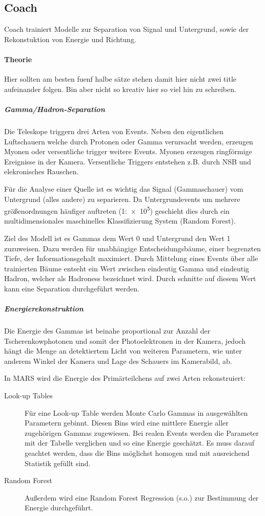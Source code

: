 \subsection{Coach}%
\label{sub:coach}
Coach trainiert Modelle zur Separation von Signal und Untergrund, 
sowie der Rekonstuktion von Energie und Richtung.
\paragraph{Theorie}%
\label{par:theorie}
{\color{red}Hier sollten am besten fuenf halbe sätze stehen damit hier nicht zwei title aufeinander
folgen. Bin aber nicht so kreativ hier so viel hin zu schreiben.}

\subparagraph{Gamma/Hadron-Separation}
Die Teleskope triggern drei Arten von Events. 
Neben den eigentlichen Luftschauern welche durch Protonen 
oder Gamma verursacht werden,
erzeugen Myonen oder versentliche trigger weitere Events.
Myonen erzeugen ringförmige Ereignisse in der Kamera.
Versentliche Triggers entstehen z.B. durch NSB und elekronisches Rauschen.

Für die Analyse einer Quelle ist es wichtig das Signal (Gammaschauer) vom 
Untergrund (alles andere) zu separieren.
Da Untergrundevents um mehrere größenordnungen häufiger auftreten (1:\num{e5})
geschieht dies durch ein multidimensionales maschinelles Klassifizierung 
System (Random Forest).

Ziel des Modell ist es Gammas dem Wert 0 und Untergrund den Wert 1 zuzuweisen.
Dazu werden für unabhängige Entscheidungsbäume, 
einer begrenzten Tiefe, 
der Informationsgehalt maximiert.
Durch Mittelung eines Events über alle trainierten Bäume entseht ein Wert
zwischen eindeutig Gamma und eindeutig Hadron, welcher als Hadroness bezeichnet
wird.
Durch schnitte auf diesem Wert kann eine Separation durchgeführt werden.

\subparagraph{Energierekonstruktion}%
\label{par:energie}

Die Energie des Gammas ist beinahe proportional
zur Anzahl der Tscherenkowphotonen
und somit der Photoelektronen in der Kamera,
jedoch hängt die Menge an detektiertem Licht von weiteren Parametern,
wie unter anderem Winkel der Kamera und Lage des Schauers im Kamerabild, ab.

In MARS wird die Energie des Primärteilchens auf zwei Arten rekonstruiert:
\begin{description}
	\item[\quad Look-up Tables] Für eine Look-up Table werden Monte Carlo 
		Gammas in ausgewählten Parametern gebinnt.
		Diesen Bins wird eine mittlere Energie aller
		zugehörigen Gammas zugewiesen.
		Bei realen Events werden die Parameter mit der Tabelle verglichen
		und so eine Energie geschätzt.
		Es muss darauf geachtet werden,
		dass die Bins möglichst homogen und mit ausreichend Statistik gefüllt sind.
	\item[\quad Random Forest] Außerdem wird eine Random Forest Regression (s.o.)
		zur Bestimmung der Energie durchgeführt.
\end{description}



